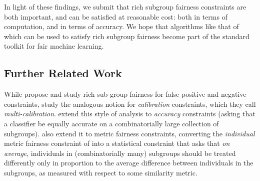 In light of these findings, we submit that rich subgroup fairness constraints are both important, and can be satisfied at reasonable cost: both in terms of computation, and in terms of accuracy. We hope that algorithms like that of \cite{KNRW18} which can be used to satisfy rich subgroup fairness become part of the standard toolkit for fair machine learning. 

\subsection{Further Related Work}
While \citet{KNRW18} propose and study rich sub-group fairness for false positive and negative constraints, \citet{multical} study the analogous notion for \emph{calibration} constraints, which they call \emph{multi-calibration}. \citet{multiac} extend this style of analysis to \emph{accuracy} constraints (asking that a classifier be equally accurate on a combinatorially large collection of subgroups). \citet{multimet} also extend it to metric fairness constraints, converting the \emph{individual} metric fairness constraint of \citet{awareness} into a statistical constraint that asks that \emph{on average}, individuals in (combinatorially many) subgroups should be treated differently only in proportion to the average difference between individuals in the subgroups, as measured with respect to some similarity metric.


